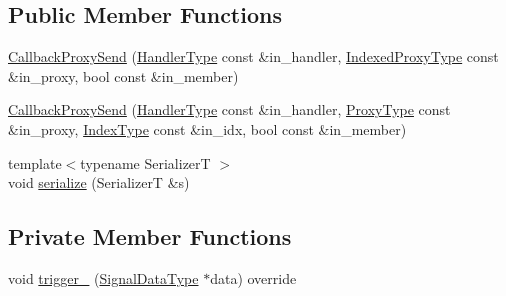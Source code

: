 \subsection*{Public Member Functions}
\begin{DoxyCompactItemize}
\item 
\hyperlink{structvt_1_1pipe_1_1callback_1_1_callback_proxy_send_afe833dd6bf8a9aef9bbd9be0f5e00c7c}{Callback\+Proxy\+Send} (\hyperlink{namespacevt_af64846b57dfcaf104da3ef6967917573}{Handler\+Type} const \&in\+\_\+handler, \hyperlink{structvt_1_1pipe_1_1callback_1_1_callback_proxy_send_a993aff1afaaf07a0d2c60a4ca96426f8}{Indexed\+Proxy\+Type} const \&in\+\_\+proxy, bool const \&in\+\_\+member)
\item 
\hyperlink{structvt_1_1pipe_1_1callback_1_1_callback_proxy_send_a053e9ba748e53084c8f58c2d1a11773b}{Callback\+Proxy\+Send} (\hyperlink{namespacevt_af64846b57dfcaf104da3ef6967917573}{Handler\+Type} const \&in\+\_\+handler, \hyperlink{structvt_1_1pipe_1_1callback_1_1_callback_proxy_send_a2aece7c6f8bd17a4c0b1fdca75d84579}{Proxy\+Type} const \&in\+\_\+proxy, \hyperlink{structvt_1_1pipe_1_1callback_1_1_callback_proxy_send_adf233dca6b029304153ba59fecf6113f}{Index\+Type} const \&in\+\_\+idx, bool const \&in\+\_\+member)
\item 
{\footnotesize template$<$typename SerializerT $>$ }\\void \hyperlink{structvt_1_1pipe_1_1callback_1_1_callback_proxy_send_a3f19aedbb799628c77163b440d3b6d03}{serialize} (SerializerT \&s)
\end{DoxyCompactItemize}
\subsection*{Private Member Functions}
\begin{DoxyCompactItemize}
\item 
void \hyperlink{structvt_1_1pipe_1_1callback_1_1_callback_proxy_send_ab961a5a59f7597cefb69603b1d31f6b1}{trigger\+\_\+} (\hyperlink{structvt_1_1pipe_1_1callback_1_1_callback_proxy_send_a2a8b17dedeb5cc2b68ca5c7386796ef3}{Signal\+Data\+Type} $\ast$data) override
\end{DoxyCompactItemize}
